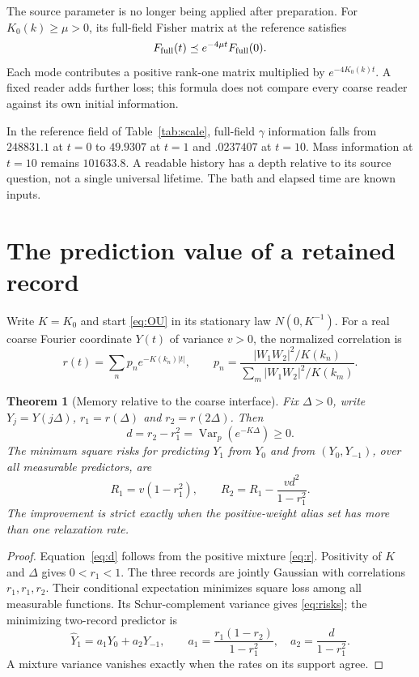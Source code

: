 \documentclass[12pt,a4paper]{article}
\newtheorem{theorem}{Theorem}[section]
\newcommand{\Var}{\operatorname{Var}}
\begin{document}
The source parameter is no longer being applied after preparation.
For $K_0(k)\geq\mu>0$, its full-field Fisher matrix at the reference
satisfies
\[
 F_{\rm full}(t)\preceq e^{-4\mu t}F_{\rm full}(0).
\]
Each mode contributes a positive rank-one matrix multiplied by
$e^{-4K_0(k)t}$. A fixed reader adds further loss; this formula does
not compare every coarse reader against its own initial information.

In the reference field of Table~\ref{tab:scale}, full-field $\gamma$
information falls from $248831.1$ at $t=0$ to $49.9307$ at $t=1$
and $.0237407$ at $t=10$. Mass information at $t=10$ remains
$101633.8$. A readable history has a depth relative to its source
question, not a single universal lifetime. The bath and elapsed time
are known inputs.

\section{The prediction value of a retained record}

Write $K=K_0$ and start \eqref{eq:OU} in its stationary law $N(0,K^{-1})$.
For a real coarse Fourier coordinate $Y(t)$ of variance $v>0$, the
normalized correlation is
\begin{equation}
 r(t)=\sum_n p_n e^{-K(k_n)|t|},\qquad
 p_n=\frac{|W_1W_2|^2/K(k_n)}
 {\sum_m|W_1W_2|^2/K(k_m)}.
 \label{eq:r}
\end{equation}

\begin{theorem}[Memory relative to the coarse interface]\label{thm:memory}
Fix $\Delta>0$, write $Y_j=Y(j\Delta)$, $r_1=r(\Delta)$ and
$r_2=r(2\Delta)$. Then
\begin{equation}
 d=r_2-r_1^2=\Var_p(e^{-K\Delta})\geq0.
 \label{eq:d}
\end{equation}
The minimum square risks for predicting $Y_1$ from $Y_0$ and from
$(Y_0,Y_{-1})$, over all measurable predictors, are
\begin{equation}
 R_1=v(1-r_1^2),\qquad
 R_2=R_1-\frac{v d^2}{1-r_1^2}.
 \label{eq:risks}
\end{equation}
The improvement is strict exactly when the positive-weight alias set
has more than one relaxation rate.
\end{theorem}
\begin{proof}
Equation~\eqref{eq:d} follows from the positive mixture \eqref{eq:r}.
Positivity of $K$ and $\Delta$ gives $0<r_1<1$.
The three records are jointly Gaussian with correlations $r_1,r_1,r_2$.
Their conditional expectation minimizes square loss among all measurable
functions. Its Schur-complement variance gives \eqref{eq:risks};
the minimizing two-record predictor is
\begin{equation}
 \widehat Y_1=a_1Y_0+a_2Y_{-1},\qquad
 a_1=\frac{r_1(1-r_2)}{1-r_1^2},\quad
 a_2=\frac{d}{1-r_1^2}.
 \label{eq:pred}
\end{equation}
A mixture variance vanishes exactly when the rates on its support agree.
\end{proof}
\end{document}
